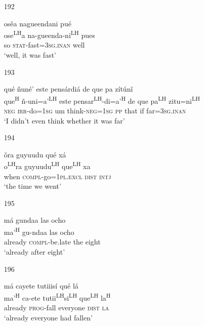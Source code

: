 \begin{itemize}
\item[192]
 
\glll   os\v{e}a nagueendani pu\'{e} \\
ose\textsuperscript{LH}a na-gueenda-ni\textsuperscript{LH} pues\\
so \textsc{stat}-fast=\textsc{3sg.inan} well\\
\glt `well, it was fast'
 


\item[193]
 
\glll   qu\'{e} \~{n}un\'{e}' este pens\'{a}rdi\'{a} de que pa z\'{i}t\'{u}n\v{i}\\
que\textsuperscript{H} \~{n}-uni=a'\textsuperscript{LH} este pensar\textsuperscript{LH}-di=a'\textsuperscript{H} de que pa\textsuperscript{LH} zitu=ni\textsuperscript{LH}\\
\textsc{neg} \textsc{irr}-do=\textsc{1sg} um think-\textsc{neg}=\textsc{1sg} \textsc{pp} that if far=\textsc{3sg.inan}\\
\glt `I didn't even think whether it was far'
 


\item[194]
 
\glll   \v{o}ra guyuudu qu\'{e} x\'{a} \\
   o\textsuperscript{LH}ra guyuudu\textsuperscript{LH} que\textsuperscript{LH} xa\\
when \textsc{compl}-go=\textsc{1pl.excl} \textsc{dist} \textsc{intj}\\
\glt `the time we went'
 


\item[195]
 
\glll   m\'{a} gundaa las ocho \\
  ma'\textsuperscript{H} gu-ndaa las ocho\\
already \textsc{compl}-be.late the eight\\
\glt `already after eight'
 


\item[196]
 
\glll   m\'{a} cayete tutiiis\'{i} qu\'{e} l\'{a} \\
ma'\textsuperscript{H} ca-ete tutii\textsuperscript{LH}si\textsuperscript{LH} que\textsuperscript{LH} la\textsuperscript{H}\\
already \textsc{prog}-fall everyone \textsc{dist} \textsc{la}\\
\glt `already everyone had fallen'
 



\end{itemize}
